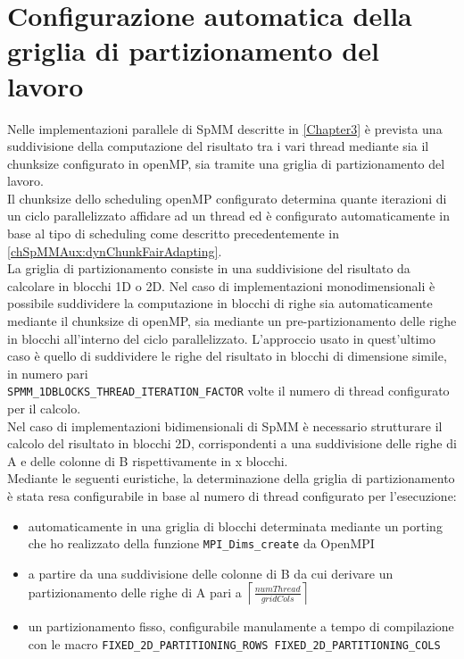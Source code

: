 \section{Configurazione automatica della griglia di partizionamento del lavoro}	\label{chSpMMAux:ompGrid}
Nelle implementazioni parallele di SpMM descritte in \ref{Chapter3} è prevista una suddivisione della computazione del risultato
tra i vari thread mediante sia il chunksize configurato in openMP, sia tramite una griglia di partizionamento del lavoro.\\
Il chunksize dello scheduling openMP configurato determina quante iterazioni di un ciclo parallelizzato affidare ad un thread
ed è configurato automaticamente in base al tipo di scheduling come descritto precedentemente in \ref{chSpMMAux:dynChunkFairAdapting}.\\
La griglia di partizionamento consiste in una suddivisione del risultato da calcolare in blocchi 1D o 2D.
\voidLine
Nel caso di implementazioni monodimensionali è possibile suddividere la computazione in blocchi di righe sia automaticamente 
mediante il chunksize di openMP, sia mediante un pre-partizionamento delle righe in blocchi all'interno del ciclo parallelizzato.
L'approccio usato in quest'ultimo caso è quello di suddividere le righe del risultato in blocchi di dimensione simile,
in numero pari \\ \verb|SPMM_1DBLOCKS_THREAD_ITERATION_FACTOR| volte il numero di thread configurato per il calcolo.\\
\voidLine
Nel caso di implementazioni bidimensionali di SpMM è necessario strutturare il calcolo del risultato in blocchi 2D, corrispondenti
a una suddivisione delle righe di A e delle colonne di B rispettivamente in x blocchi.\\
Mediante le seguenti euristiche, la determinazione della griglia di partizionamento è stata resa configurabile 
in base al numero di thread configurato per l'esecuzione:\\
\begin{itemize}
	\item	automaticamente in una griglia di blocchi determinata mediante un porting che ho realizzato 
			della funzione \verb|MPI_Dims_create| da OpenMPI
	\item	a partire da una suddivisione delle colonne di B 
			da cui derivare un partizionamento delle righe di A pari a $\left\lceil \frac{numThread}{gridCols}  \right\rceil$
	\item	un partizionamento fisso, configurabile manulamente a tempo di compilazione con le macro
			\verb|FIXED_2D_PARTITIONING_ROWS FIXED_2D_PARTITIONING_COLS|
\end{itemize}
